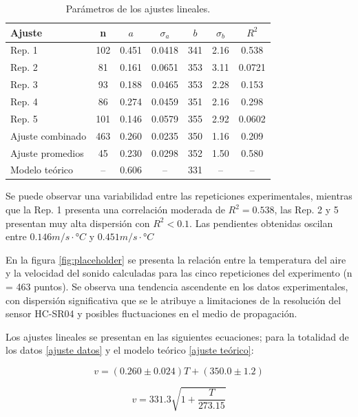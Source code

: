\documentclass[conference]{IEEEtran}
\begin{document}
\begin{table}[ht]
\centering
\caption{Parámetros de los ajustes lineales.}
\label{tab:ajustes}
\begin{tabular}{lcccccc}
\toprule
\textbf{Ajuste} & \textbf{n} & \textbf{$a$} & \textbf{$\sigma_a$} & \textbf{$b$} & \textbf{$\sigma_b$} & \textbf{$R^2$} \\
\midrule
Rep. 1 & 102 & 0.451 & 0.0418 & 341 & 2.16 & 0.538 \\
Rep. 2 & 81  & 0.161 & 0.0651 & 353 & 3.11 & 0.0721 \\
Rep. 3 & 93  & 0.188 & 0.0465 & 353 & 2.28 & 0.153 \\
Rep. 4 & 86  & 0.274 & 0.0459 & 351 & 2.16 & 0.298 \\
Rep. 5 & 101 & 0.146 & 0.0579 & 355 & 2.92 & 0.0602 \\
\midrule
Ajuste combinado & 463 & 0.260 & 0.0235 & 350 & 1.16 & 0.209 \\
Ajuste promedios& 45 & 0.230 & 0.0298 & 352 & 1.50 & 0.580 \\
\midrule
Modelo teórico & -- & 0.606 & -- & 331 & -- & -- \\
\bottomrule
\end{tabular}
\end{table}

Se puede observar una variabilidad entre las repeticiones experimentales, mientras que la Rep. 1 presenta una correlación moderada de $R^2 = 0.538$, las Rep. 2 y 5 presentan muy alta dispersión con $R^2 < 0.1$. Las pendientes obtenidas oscilan entre $0.146m/s \cdot °C$ y $0.451 m/s \cdot °C$

En la figura \ref{fig:placeholder} se presenta la relación entre la temperatura del aire y la velocidad del sonido calculadas para las cinco repeticiones del experimento (n = 463 puntos). Se observa una tendencia ascendente en los datos experimentales, con dispersión significativa que se le atribuye a limitaciones de la resolución del sensor HC-SR04 y posibles fluctuaciones en el medio de propagación.

Los ajustes lineales se presentan en las siguientes ecuaciones; para la totalidad de los datos \eqref{ajuste datos} y el modelo teórico \eqref{ajuste teórico}:

\begin{equation}
    v = (0.260 \pm 0.024)T + (350.0 \pm 1.2)
    \label{ajuste datos}
\end{equation}

\begin{equation}
    v = 331.3 \sqrt{1 + \frac{T}{273.15}}
    \label{ajuste teórico}
\end{equation}
\end{document}
